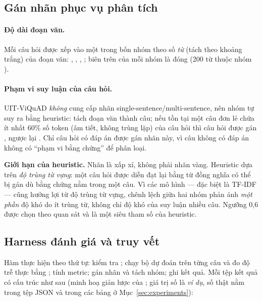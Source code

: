 \subsection{Gán nhãn phục vụ phân tích}
\label{sec:tagging}

\paragraph{Độ dài đoạn văn.} Mỗi câu hỏi được xếp vào một trong bốn nhóm theo số \emph{từ}
(tách theo khoảng trắng) của đoạn văn: , , ,
; biên trên của mỗi nhóm là đóng (200 từ thuộc nhóm ).

\paragraph{Phạm vi suy luận của câu hỏi.} UIT-ViQuAD \emph{không} cung cấp nhãn
single-sentence/multi-sentence, nên nhóm tự suy ra bằng heuristic: tách đoạn văn thành câu;
nếu tồn tại một câu đơn lẻ chứa ít nhất 60\% số token (âm tiết, không trùng lặp) của câu
hỏi thì câu hỏi được gán , ngược lại . Chỉ câu hỏi
có đáp án được gán nhãn này, vì câu không có đáp án không có ``phạm vi bằng chứng'' để phân
loại.

\begin{warnbox}
\textbf{Giới hạn của heuristic.} Nhãn  là xấp xỉ, không phải nhãn vàng.
Heuristic dựa trên \emph{độ trùng từ vựng}: một câu hỏi được diễn đạt lại bằng từ đồng nghĩa
có thể bị gán  dù bằng chứng nằm trong một câu. Vì các mô hình --- đặc
biệt là TF-IDF --- cũng hưởng lợi từ độ trùng từ vựng, chênh lệch giữa hai nhóm phản ánh
\emph{một phần} độ khó do ít trùng từ, không chỉ độ khó của suy luận nhiều câu. Ngưỡng 0,6
được chọn theo quan sát và là một siêu tham số của heuristic.
\end{warnbox}

\subsection{Harness đánh giá và truy vết}
\label{sec:harness}

Hàm  thực hiện theo thứ tự: kiểm tra ; chạy bộ
dự đoán trên từng câu và đo độ trễ thực bằng ; tính metric; gán nhãn
và tách nhóm; ghi kết quả. Mỗi tệp kết quả có cấu trúc như sau (minh hoạ giản lược của
; giá trị số là \emph{ví dụ}, số thật nằm
trong tệp JSON và trong các bảng ở Mục~\ref{sec:experiments}):

